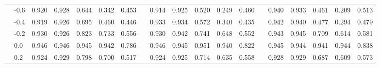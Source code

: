 \begin{table}
{\begin{tabular}{llccccccccccccccccc}
 & -0.6 & \cellcolor[HTML]{C0E3EF}0.920 & \cellcolor[HTML]{B1DCEB}0.928 & \cellcolor[HTML]{FEDD8E}0.644 & \cellcolor[HTML]{FDB365}0.342 & \cellcolor[HTML]{FEBF71}0.453 & & \cellcolor[HTML]{C8E7F1}0.914 & \cellcolor[HTML]{B7DFEC}0.925 & \cellcolor[HTML]{FFD081}0.520 & \cellcolor[HTML]{FDB264}0.249 & \cellcolor[HTML]{FEC879}0.460 & & \cellcolor[HTML]{88BCDA}0.940 & \cellcolor[HTML]{9DCDE3}0.933 & \cellcolor[HTML]{FFCB7C}0.461 & \cellcolor[HTML]{FDB164}0.209 & \cellcolor[HTML]{FFD283}0.513 \\
 & -0.4 & \cellcolor[HTML]{C2E4EF}0.919 & \cellcolor[HTML]{B5DEEC}0.926 & \cellcolor[HTML]{FFE598}0.695 & \cellcolor[HTML]{FEC072}0.460 & \cellcolor[HTML]{FEBF70}0.446 & & \cellcolor[HTML]{A7D6E7}0.933 & \cellcolor[HTML]{A5D4E6}0.934 & \cellcolor[HTML]{FED888}0.572 & \cellcolor[HTML]{FEBA6C}0.340 & \cellcolor[HTML]{FEC576}0.435 & & \cellcolor[HTML]{81B7D6}0.942 & \cellcolor[HTML]{88BCDA}0.940 & \cellcolor[HTML]{FFCD7E}0.477 & \cellcolor[HTML]{FEB96B}0.294 & \cellcolor[HTML]{FFCE7E}0.479 \\
 & -0.2 & \cellcolor[HTML]{ACD9E9}0.930 & \cellcolor[HTML]{B5DEEC}0.926 & \cellcolor[HTML]{FFFFC0}0.823 & \cellcolor[HTML]{FFEBA1}0.733 & \cellcolor[HTML]{FFCE7F}0.556 & & \cellcolor[HTML]{AEDAEA}0.930 & \cellcolor[HTML]{90C2DD}0.942 & \cellcolor[HTML]{FFF1AA}0.741 & \cellcolor[HTML]{FEE395}0.648 & \cellcolor[HTML]{FED585}0.552 & & \cellcolor[HTML]{7DB4D5}0.943 & \cellcolor[HTML]{74ADD1}0.945 & \cellcolor[HTML]{FFEEA5}0.709 & \cellcolor[HTML]{FEE192}0.614 & \cellcolor[HTML]{FEDD8D}0.581 \\
 & 0.0 & \cellcolor[HTML]{74ADD1}0.946 & \cellcolor[HTML]{74ADD1}0.946 & \cellcolor[HTML]{79B1D3}0.945 & \cellcolor[HTML]{87BCD9}0.942 & \cellcolor[HTML]{FFF6B1}0.786 & & \cellcolor[HTML]{81B7D7}0.946 & \cellcolor[HTML]{85BAD8}0.945 & \cellcolor[HTML]{74ADD1}0.951 & \cellcolor[HTML]{96C7DF}0.940 & \cellcolor[HTML]{FCFDC7}0.822 & & \cellcolor[HTML]{74ADD1}0.945 & \cellcolor[HTML]{79B0D3}0.944 & \cellcolor[HTML]{85BAD8}0.941 & \cellcolor[HTML]{79B0D3}0.944 & \cellcolor[HTML]{F5FAD4}0.838 \\
 & 0.2 & \cellcolor[HTML]{B9E0ED}0.924 & \cellcolor[HTML]{AEDBEA}0.929 & \cellcolor[HTML]{FFF9B6}0.798 & \cellcolor[HTML]{FFE699}0.700 & \cellcolor[HTML]{FEC879}0.517 & & \cellcolor[HTML]{B9E0ED}0.924 & \cellcolor[HTML]{B7DFEC}0.925 & \cellcolor[HTML]{FFEDA3}0.714 & \cellcolor[HTML]{FEE293}0.635 & \cellcolor[HTML]{FED686}0.558 & & \cellcolor[HTML]{A8D6E8}0.928 & \cellcolor[HTML]{A6D5E7}0.929 & \cellcolor[HTML]{FFEBA0}0.687 & \cellcolor[HTML]{FEE191}0.609 & \cellcolor[HTML]{FEDB8B}0.573 \\

\end{tabular}}
\end{table}
